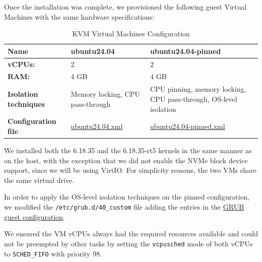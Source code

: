 Once the installation was complete, we provisioned the following guest
Virtual Machines with the same hardware specifications:

\begin{table}
\centering
\caption{KVM Virtual Machines Configuration}
\label{tab:setup:kvm-vms}
\begin{tabularx}{\linewidth}{@{}YYY@{}}
\toprule
Name & ubuntu24.04 & ubuntu24.04-pinned\tabularnewline
\midrule
\textbf{vCPUs:} & 2 & 2\tabularnewline
\textbf{RAM:} & 4 GB & 4 GB\tabularnewline
\textbf{Isolation techniques} & Memory locking, CPU pass-through & CPU pinning, memory locking, CPU pass-through, OS-level isolation\tabularnewline
\textbf{Configuration file} & \href{KVM/vms/ubuntu24.04.xml}{ubuntu24.04.xml} & \href{KVM/vms/ubuntu24.04-pinned.xml}{ubuntu24.04-pinned.xml}\tabularnewline
\bottomrule
\end{tabularx}
\end{table}

We installed both the 6.18.35 and the 6.18.35-rt5 kernels in the same
manner as on the host, with the exception that we did not enable the
NVMe block device support, since we will be using VirtIO. For simplicity
reasons, the two VMs share the same virtual drive.

In order to apply the OS-level isolation techniques on the pinned
configuration, we modified the \texttt{/etc/grub.d/40\_custom} file
adding the entries in the \href{KVM/grub_cfg/40_custom_guest}{GRUB guest
configuration}.

We ensured the VM vCPUs always had the required resources available and
could not be preempted by other tasks by setting the \texttt{vcpusched}
mode of both vCPUs to \texttt{SCHED\_FIFO} with priority 98.

\begin{Shaded}
\begin{Highlighting}[]
\StringTok{\textquotesingle{}0\textquotesingle{}}\StringTok{\textquotesingle{}98\textquotesingle{}}\KeywordTok{/\textgreater{}}
\StringTok{\textquotesingle{}1\textquotesingle{}}\StringTok{\textquotesingle{}98\textquotesingle{}}\KeywordTok{/\textgreater{}}
\end{Highlighting}
\end{Shaded}

